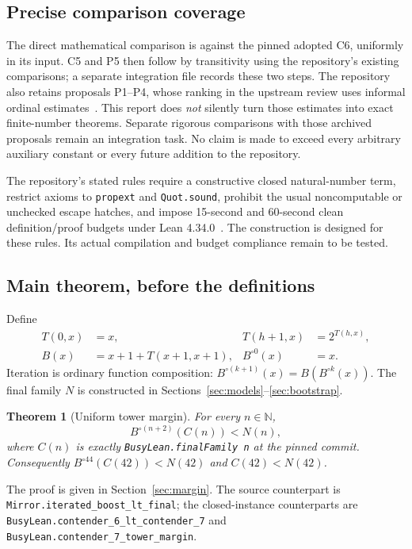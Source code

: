 \documentclass[11pt,letterpaper]{article}
\newtheorem{theorem}{Theorem}[section]
\theoremstyle{definition}
\newcommand{\N}{\mathbb N}
\newcommand{\code}[1]{\nolinkurl{#1}}
\begin{document}
\subsection{Precise comparison coverage}

The direct mathematical comparison is against the pinned adopted C6, uniformly
in its input. C5 and P5 then follow by transitivity using the repository's
existing comparisons; a separate integration file records these two steps.
The repository also retains proposals P1--P4, whose ranking in the upstream
review uses informal ordinal estimates~\cite{review}. This report does
\emph{not} silently turn those estimates into exact finite-number theorems.
Separate rigorous comparisons with those archived proposals remain an
integration task. No claim is made to exceed every arbitrary auxiliary
constant or every future addition to the repository.

The repository's stated rules require a constructive closed natural-number
term, restrict axioms to \code{propext} and \code{Quot.sound}, prohibit the
usual noncomputable or unchecked escape hatches, and impose 15-second and
60-second clean definition/proof budgets under Lean 4.34.0~\cite{repo}.
The construction is designed for these rules. Its actual compilation and
budget compliance remain to be tested.

\subsection{Main theorem, before the definitions}

Define
\begin{align}
 T(0,x)&=x,&T(h+1,x)&=2^{T(h,x)},\\
 B(x)&=x+1+T(x+1,x+1),&
 B^{\circ0}(x)&=x.
\end{align}
Iteration is ordinary function composition:
$B^{\circ(k+1)}(x)=B(B^{\circ k}(x))$. The final family $N$ is constructed in
Sections~\ref{sec:models}--\ref{sec:bootstrap}.

\begin{theorem}[Uniform tower margin]
\label{thm:mainintro}
For every $n\in\N$,
\[
 B^{\circ(n+2)}(C(n))<N(n),
\]
where $C(n)$ is exactly \code{BusyLean.finalFamily n} at the pinned commit.
Consequently $B^{\circ44}(C(42))<N(42)$ and $C(42)<N(42)$.
\end{theorem}

The proof is given in Section~\ref{sec:margin}. The source counterpart is
\code{Mirror.iterated_boost_lt_final}; the closed-instance counterparts are
\code{BusyLean.contender_6_lt_contender_7} and
\code{BusyLean.contender_7_tower_margin}.
\end{document}
